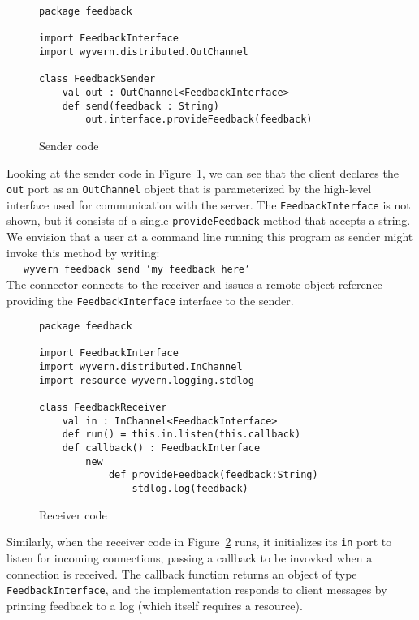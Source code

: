 \documentclass[runningheads]{llncs}
\begin{document}
\begin{sloppypar}
\begin{figure}[t]
\begin{lstlisting}
package feedback

import FeedbackInterface
import wyvern.distributed.OutChannel

class FeedbackSender
    val out : OutChannel<FeedbackInterface>
    def send(feedback : String)
        out.interface.provideFeedback(feedback)
\end{lstlisting}
\caption{Sender code}
\label{f-client}
\end{figure}


Looking at the sender code in Figure~\ref{f-client}, we can see that the client declares the \texttt{out} port as an \texttt{OutChannel} object that is parameterized by the high-level interface used for communication with the server.  The \texttt{FeedbackInterface} is not shown, but it consists of a single \texttt{provideFeedback} method that accepts a string.  We envision that a user at a command line running this program as sender might invoke this method by writing:\\
~~~\texttt{wyvern feedback send 'my feedback here'}\\
The connector connects to the receiver and issues a remote object reference providing the  \texttt{FeedbackInterface} interface to the sender.


\begin{figure}[t]
\begin{lstlisting}
package feedback

import FeedbackInterface
import wyvern.distributed.InChannel
import resource wyvern.logging.stdlog

class FeedbackReceiver
    val in : InChannel<FeedbackInterface>
    def run() = this.in.listen(this.callback)
    def callback() : FeedbackInterface
        new
            def provideFeedback(feedback:String)
                stdlog.log(feedback)

\end{lstlisting}
\caption{Receiver code}
\label{f-server}
\end{figure}


Similarly, when the receiver code in Figure~\ref{f-server} runs, it initializes its \texttt{in} port to listen for incoming connections, passing a callback to be invovked when a connection is received.  The callback function returns an object of type \texttt{FeedbackInterface}, and the implementation responds to client messages by printing feedback to a log (which itself requires a resource).



\end{sloppypar}
\end{document}
